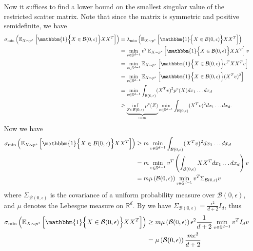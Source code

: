 \documentclass[11pt]{article}
\begin{document}
Now it suffices to find a lower bound on the smallest singular value of the restricted scatter matrix. Note that since the matrix is symmetric and positive semidefinite, we have 
\begin{align*}
    \sigma_{\min}\left(\mathbb{E}_{X\sim p^*}\left[\mathbbm{1}\Big\{X \in \mathcal{B}(0, \epsilon)\Big\}XX^{T}\right]\right) &= \lambda_{\min}\left(\mathbb{E}_{X\sim p^*}\left[\mathbbm{1}\Big\{X \in \mathcal{B}(0, \epsilon)\Big\}XX^{T}\right]\right) \\
    &= \min_{v \in \mathbb{S}^{d-1}}v^{T}\mathbb{E}_{X\sim p^*}\left[\mathbbm{1}\Big\{X \in \mathcal{B}(0, \epsilon)\Big\}XX^{T}\right]v \\
    &= \min_{v \in \mathbb{S}^{d-1}}\mathbb{E}_{X\sim p^*}\left[\mathbbm{1}\Big\{X \in \mathcal{B}(0, \epsilon)\Big\}v^{T}XX^{T}v\right] \\
    &= \min_{v \in \mathbb{S}^{d-1}}\mathbb{E}_{X\sim p^*}\left[\mathbbm{1}\Big\{X \in \mathcal{B}(0, \epsilon)\Big\}(X^{T}v)^2\right] \\
    &= \min_{v \in \mathbb{S}^{d-1}} \int_{\mathcal{B}(0, \epsilon)}(X^{T}v)^2p^*(X)dx_1\dots dx_d \\
    & \geq \underbrace{\inf_{Z\in \mathcal{B}(0, \epsilon)}p^*(Z)}_{:=m}\min_{v \in \mathbb{S}^{d-1}} \int_{\mathcal{B}(0, \epsilon)}(X^{T}v)^2dx_1\dots dx_d.
\end{align*}
Now we have
\begin{align}
    \sigma_{\min}\left(\mathbb{E}_{X\sim p^*}\left[\mathbbm{1}\Big\{X \in \mathcal{B}(0, \epsilon)\Big\}XX^{T}\right]\right) &\geq m\min_{v \in \mathbb{S}^{d-1}} \int_{\mathcal{B}(0, \epsilon)}(X^{T}v)^2dx_1\dots dx_d \\
    &= m \min_{v \in \mathbb{S}^{d-1}} v^{T}\left(\int_{\mathcal{B}(0,\epsilon)}XX^{T} dx_1\dots dx_d\right)v \\
    &= m \mu\left(\mathcal{B}(0, \epsilon)\right)  \min_{v \in \mathbb{S}^{d-1}} v^{T}\Sigma_{\mathcal{B}(0,\epsilon)} v
\end{align}
where $\Sigma_{\mathcal{B}(0,\epsilon)}$ is the covariance of a uniform probability measure over $\mathcal{B}(0,\epsilon)$, and $\mu$ denotes the Lebesgue measure on $\mathbb{R}^d$. By  we have $\Sigma_{\mathcal{B}(0,\epsilon)} = \frac{\epsilon^2}{d+2}I_d$, thus
\begin{align}
    \sigma_{\min}\left(\mathbb{E}_{X\sim p^*}\left[\mathbbm{1}\Big\{X \in \mathcal{B}(0, \epsilon)\Big\}XX^{T}\right]\right) &\geq m \mu\left(\mathcal{B}(0, \epsilon)\right) \epsilon^2 \frac{1}{d+2} \min_{v \in \mathbb{S}^{d-1}} v^{T}I_d v \\
    &= \mu\left(\mathcal{B}(0, \epsilon)\right) \frac{m\epsilon^2}{d+2} \label{eq: denominator bound 2}
\end{align}
\end{document}
